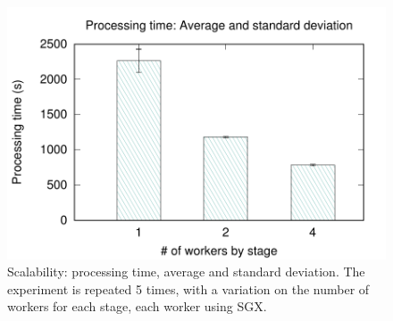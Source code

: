 



\begin{figure}[t!]
  \centering  \includegraphics[width=\linewidth]{plots/secure_streams/scalability/sgxfull_scalability}
  \caption{Scalability: processing time, average and standard deviation. The experiment is repeated 5 times, with a variation on the number of workers for each stage, each worker using SGX.}
  \label{fig:scalability:sgxfull}
\end{figure}

